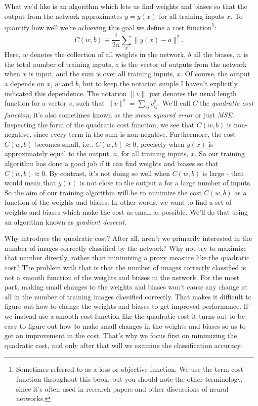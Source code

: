 What we'd like is an algorithm which lets us find weights and biases so that the output from the network approximates $y=y(x)$ for all training inputs $x$. To quantify how well we're achieving this goal we define a cost function\footnote{Sometimes referred to as a loss or objective function. We use the term cost function throughout this book, but you should note the other terminology, since it's often used in research papers and other discussions of neural networks.}:
\begin{equation}
C(w, b) \equiv \frac{1}{2 n} \sum_{x}\parallel y(x)-a\parallel ^{2}.
\label{eq:c01-06-MSEcostfunction}
\end{equation}
Here, $w$ denotes the collection of all weights in the network, $b$ all the biases, $n$ is the total number of training inputs, $a$ is the vector of outputs from the network when $x$ is input, and the sum is over all training inputs, $x$. Of course, the output a depends on $x$, $w$ and $b$, but to keep the notation simple I haven't explicitly indicated this dependence. 
The notation $\parallel v\parallel$ just denotes the usual length function for a vector $v$, such that
$\parallel v\parallel^2=\sum_{ij}v^2_{ij}$. 
We'll call $C$ the \textit{quadratic cost function}; it's also sometimes known as the \textit{mean squared error} or just \textit{MSE}. Inspecting the form of the quadratic cost function, we see that $C(w,b)$ is non-negative, since every term in the sum is non-negative. Furthermore, the cost $C(w,b)$ becomes small, i.e., $C(w,b)\approx 0$, precisely when $y(x)$ is approximately equal to the output, $a$, for all training inputs, $x$. So our training algorithm has done a good job if it can find weights and biases so that $C(w,b)\approx 0$. By contrast, it's not doing so well when $C(w,b)$ is large - that would mean that $y(x)$ is not close to the output a for a large number of inputs. So the aim of our training algorithm will be to minimize the cost $C(w,b)$ as a function of the weights and biases. In other words, we want to find a set of weights and biases which make the cost as small as possible. We'll do that using an algorithm known as \textit{gradient descent}.

Why introduce the quadratic cost? After all, aren't we primarily interested in the number of images correctly classified by the network? Why not try to maximize that number directly, rather than minimizing a proxy measure like the quadratic cost? The problem with that is that the number of images correctly classified is not a smooth function of the weights and biases in the network. For the most part, making small changes to the weights and biases won't cause any change at all in the number of training images classified correctly. That makes it difficult to figure out how to change the weights and biases to get improved performance. If we instead use a smooth cost function like the quadratic cost it turns out to be easy to figure out how to make small changes in the weights and biases so as to get an improvement in the cost. That's why we focus first on minimizing the quadratic cost, and only after that will we examine the classification accuracy.

